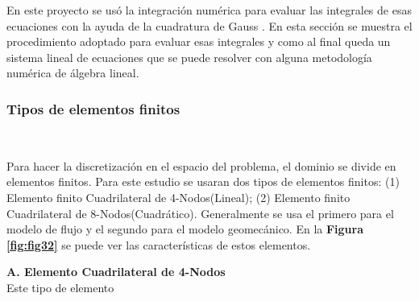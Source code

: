 En este proyecto se usó la integración numérica para evaluar las integrales de esas ecuaciones con la ayuda de la cuadratura de Gauss . En esta sección se muestra el procedimiento adoptado para evaluar esas integrales y como al final queda un sistema lineal de ecuaciones que se puede resolver con alguna metodología numérica de álgebra lineal.\bigskip


\subsubsection{Tipos de elementos finitos}~\hypertarget{sec:sec3421}{}
\label{sec:sec3421}

Para hacer la discretización en el espacio del problema, el dominio se divide en elementos finitos. Para este estudio se usaran dos tipos de elementos finitos: (1) Elemento finito Cuadrilateral de 4-Nodos(Lineal); (2) Elemento finito Cuadrilateral de 8-Nodos(Cuadrático). Generalmente se usa el primero para el modelo de flujo y el segundo para el modelo geomecánico. En la  \textbf{Figura} \textbf{\ref{fig:fig32}} se puede ver las características de estos elementos.\bigskip




\bigskip
\textbf{A. Elemento Cuadrilateral de 4-Nodos}\\
Este tipo de elemento





